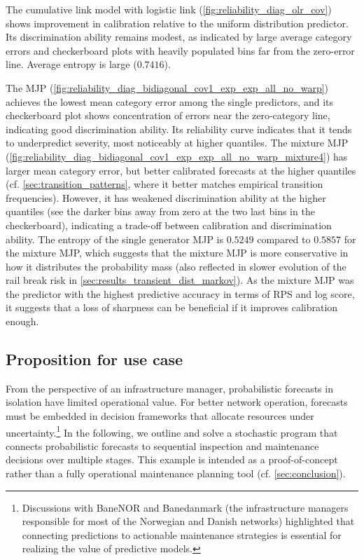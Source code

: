 \documentclass{article}
\begin{document}
The cumulative link model with logistic link (\cref{fig:reliability_diag_olr_cov}) shows improvement in calibration relative to the uniform distribution predictor.
Its discrimination ability remains modest, as indicated by large average category errors and checkerboard plots with heavily populated bins far from the zero-error line. Average entropy is large ($0.7416$).

The MJP (\cref{fig:reliability_diag_bidiagonal_cov1_exp_exp_all_no_warp}) achieves the lowest mean category error among the single predictors, and its checkerboard plot shows concentration of errors near the zero-category line, indicating good discrimination ability.
Its reliability curve indicates that it tends to underpredict severity, most noticeably at higher quantiles.
The mixture MJP (\cref{fig:reliability_diag_bidiagonal_cov1_exp_exp_all_no_warp_mixture4}) has larger mean category error, but better calibrated forecasts at the higher quantiles (cf. \cref{sec:transition_patterns}, where it better matches empirical transition frequencies). However, it has weakened discrimination ability at the higher quantiles (see the darker bins away from zero at the two last bins in the checkerboard), indicating a trade-off between calibration and discrimination ability.
The entropy of the single generator MJP is $0.5249$ compared to $0.5857$ for the mixture MJP, which suggests that the mixture MJP is more conservative in how it distributes the probability mass (also reflected in slower evolution of the rail break risk in \cref{sec:results_transient_dist_markov}). As the mixture MJP was the predictor with the highest predictive accuracy in terms of RPS and log score, it suggests that a loss of sharpness can be beneficial if it improves calibration enough.



\subsection{Proposition for use case} \label{sec:proposition_for_use}
From the perspective of an infrastructure manager, probabilistic forecasts in isolation have limited operational value. 
For better network operation, forecasts must be embedded in decision frameworks that allocate resources under uncertainty.\footnote{Discussions with BaneNOR and Banedanmark (the infrastructure managers responsible for most of the Norwegian and Danish networks) highlighted that connecting predictions to actionable maintenance strategies is essential for realizing the value of predictive models.}
In the following, we outline and solve a stochastic program that connects probabilistic forecasts to sequential inspection and maintenance decisions over multiple stages. This example is intended as a proof-of-concept rather than a fully operational maintenance planning tool (cf. \cref{sec:conclusion}).
\end{document}
